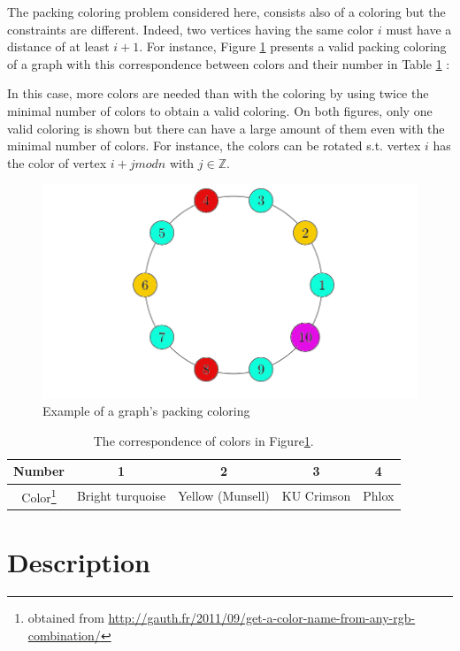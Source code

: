 The packing coloring problem considered here, consists also of a coloring but the constraints are different. Indeed, two vertices having the same color $i$ must have a distance of at least $i+1$. For instance, Figure \ref{fig:graphPackingColored} presents a valid packing coloring of a graph with this correspondence between colors and their number in Table \ref{tab:colors}  :



In this case, more colors are needed than with the coloring by using twice the minimal number of colors to obtain a valid coloring. On both figures, only one valid coloring is shown but there can have a large amount of them even with the minimal number of colors. For instance, the colors can be rotated s.t. vertex $i$ has the color of vertex $i + j mod n$ with $j \in \mathbb{Z}$.

\begin{figure}[H]
\centering
\includegraphics[scale=0.3]{figures/graphPackingColoredV2.png}
\caption{Example of a graph's packing coloring}
\label{fig:graphPackingColored}
\end{figure}

\begin{table}[H]
\centering
\begin{tabular}{|c|c|c|c|c|}
\hline
Number & 1 & 2 & 3 & 4\\
\hline
Color\footnote{obtained from \url{http://gauth.fr/2011/09/get-a-color-name-from-any-rgb-combination/}} &  Bright turquoise & Yellow (Munsell) & KU Crimson & Phlox\\
\hline
\end{tabular}
\caption{The correspondence of colors in Figure\ref{fig:graphPackingColored}.}
\label{tab:colors}
\end{table}

\section{Description}

